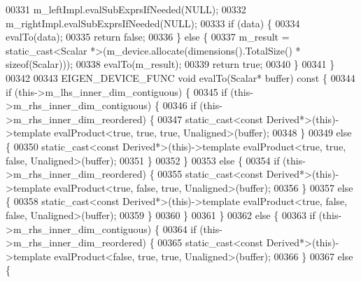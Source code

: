 \begin{DoxyCode}
00331     m\_leftImpl.evalSubExprsIfNeeded(NULL);
00332     m\_rightImpl.evalSubExprsIfNeeded(NULL);
00333     \textcolor{keywordflow}{if} (data) \{
00334       evalTo(data);
00335       \textcolor{keywordflow}{return} \textcolor{keyword}{false};
00336     \} \textcolor{keywordflow}{else} \{
00337       m\_result = \textcolor{keyword}{static\_cast<}Scalar *\textcolor{keyword}{>}(m\_device.allocate(dimensions().TotalSize() * \textcolor{keyword}{sizeof}(Scalar)));
00338       evalTo(m\_result);
00339       \textcolor{keywordflow}{return} \textcolor{keyword}{true};
00340     \}
00341   \}
00342 
00343   EIGEN\_DEVICE\_FUNC \textcolor{keywordtype}{void} evalTo(Scalar* buffer)\textcolor{keyword}{ const }\{
00344     \textcolor{keywordflow}{if} (this->m\_lhs\_inner\_dim\_contiguous) \{
00345       \textcolor{keywordflow}{if} (this->m\_rhs\_inner\_dim\_contiguous) \{
00346         \textcolor{keywordflow}{if} (this->m\_rhs\_inner\_dim\_reordered) \{
00347           \textcolor{keyword}{static\_cast<}\textcolor{keyword}{const }Derived*\textcolor{keyword}{>}(\textcolor{keyword}{this})->\textcolor{keyword}{template} evalProduct<true, true, true, Unaligned>(buffer);
00348         \}
00349         \textcolor{keywordflow}{else} \{
00350           \textcolor{keyword}{static\_cast<}\textcolor{keyword}{const }Derived*\textcolor{keyword}{>}(\textcolor{keyword}{this})->\textcolor{keyword}{template} evalProduct<true, true, false, Unaligned>(buffer);
00351         \}
00352       \}
00353       \textcolor{keywordflow}{else} \{
00354        \textcolor{keywordflow}{if} (this->m\_rhs\_inner\_dim\_reordered) \{
00355           \textcolor{keyword}{static\_cast<}\textcolor{keyword}{const }Derived*\textcolor{keyword}{>}(\textcolor{keyword}{this})->\textcolor{keyword}{template} evalProduct<true, false, true, Unaligned>(buffer);
00356         \}
00357         \textcolor{keywordflow}{else} \{
00358           \textcolor{keyword}{static\_cast<}\textcolor{keyword}{const }Derived*\textcolor{keyword}{>}(\textcolor{keyword}{this})->\textcolor{keyword}{template} evalProduct<true, false, false, Unaligned>(buffer);
00359         \}
00360       \}
00361     \}
00362     \textcolor{keywordflow}{else} \{
00363       \textcolor{keywordflow}{if} (this->m\_rhs\_inner\_dim\_contiguous) \{
00364         \textcolor{keywordflow}{if} (this->m\_rhs\_inner\_dim\_reordered) \{
00365           \textcolor{keyword}{static\_cast<}\textcolor{keyword}{const }Derived*\textcolor{keyword}{>}(\textcolor{keyword}{this})->\textcolor{keyword}{template} evalProduct<false, true, true, Unaligned>(buffer);
00366         \}
00367         \textcolor{keywordflow}{else} \{

\end{DoxyCode}

